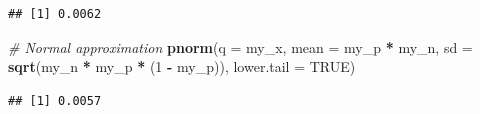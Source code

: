 \documentclass[
]{book}
\newenvironment{Shaded}{\begin{snugshade}}{\end{snugshade}}
\newcommand{\CommentTok}[1]{\textcolor[rgb]{0.56,0.35,0.01}{\textit{#1}}}
\newcommand{\DataTypeTok}[1]{\textcolor[rgb]{0.13,0.29,0.53}{#1}}
\newcommand{\DecValTok}[1]{\textcolor[rgb]{0.00,0.00,0.81}{#1}}
\newcommand{\KeywordTok}[1]{\textcolor[rgb]{0.13,0.29,0.53}{\textbf{#1}}}
\newcommand{\NormalTok}[1]{#1}
\newcommand{\OperatorTok}[1]{\textcolor[rgb]{0.81,0.36,0.00}{\textbf{#1}}}
\newcommand{\OtherTok}[1]{\textcolor[rgb]{0.56,0.35,0.01}{#1}}
\newcommand{\StringTok}[1]{\textcolor[rgb]{0.31,0.60,0.02}{#1}}
\begin{document}
\begin{verbatim}
## [1] 0.0062
\end{verbatim}

\begin{Shaded}
\begin{Highlighting}[]
\CommentTok{# Normal approximation}
\KeywordTok{pnorm}\NormalTok{(}\DataTypeTok{q =}\NormalTok{ my_x, }\DataTypeTok{mean =}\NormalTok{ my_p }\OperatorTok{*}\StringTok{ }\NormalTok{my_n, }\DataTypeTok{sd =} \KeywordTok{sqrt}\NormalTok{(my_n }\OperatorTok{*}\StringTok{ }\NormalTok{my_p }\OperatorTok{*}\StringTok{ }\NormalTok{(}\DecValTok{1} \OperatorTok{-}\StringTok{ }\NormalTok{my_p)), }\DataTypeTok{lower.tail =} \OtherTok{TRUE}\NormalTok{)}
\end{Highlighting}
\end{Shaded}

\begin{verbatim}
## [1] 0.0057
\end{verbatim}
\end{document}

